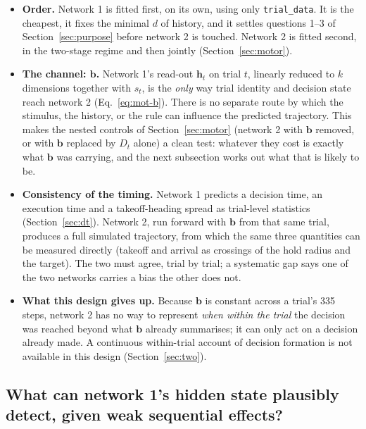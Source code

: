 \documentclass[11pt,a4paper]{article}
\newcommand{\vect}[1]{\bm{#1}}
\begin{document}
\begin{itemize}[leftmargin=*]
\item \textbf{Order.} Network 1 is fitted first, on its own, using only
      \texttt{trial\_data}. It is the cheapest, it fixes the minimal $d$ of history, and
      it settles questions 1--3 of Section~\ref{sec:purpose} before network 2 is touched.
      Network 2 is fitted second, in the two-stage regime and then jointly
      (Section~\ref{sec:motor}).
\item \textbf{The channel: $\vect{b}$.} Network 1's read-out $\vect{h}_t$ on trial $t$,
      linearly reduced to $k$ dimensions together with $s_t$, is the \emph{only} way
      trial identity and decision state reach network 2 (Eq.~\eqref{eq:mot-b}). There is
      no separate route by which the stimulus, the history, or the rule can influence the
      predicted trajectory. This makes the nested controls of Section~\ref{sec:motor}
      (network 2 with $\vect{b}$ removed, or with $\vect{b}$ replaced by $D_t$ alone) a
      clean test: whatever they cost is exactly what $\vect{b}$ was carrying, and the
      next subsection works out what that is likely to be.
\item \textbf{Consistency of the timing.} Network 1 predicts a decision time, an
      execution time and a takeoff-heading spread as trial-level statistics
      (Section~\ref{sec:dt}). Network 2, run forward with $\vect{b}$ from that same
      trial, produces a full simulated trajectory, from which the same three quantities
      can be measured directly (takeoff and arrival as crossings of the hold radius and
      the target). The two must agree, trial by trial; a systematic gap says one of the
      two networks carries a bias the other does not.
\item \textbf{What this design gives up.} Because $\vect{b}$ is constant across a
      trial's 335 steps, network 2 has no way to represent \emph{when within the trial}
      the decision was reached beyond what $\vect{b}$ already summarises; it can only
      act on a decision already made. A continuous within-trial account of decision
      formation is not available in this design (Section~\ref{sec:two}).
\end{itemize}

\subsection{What can network 1's hidden state plausibly detect, given weak sequential effects?}
\label{sec:hidden-content}
\end{document}
